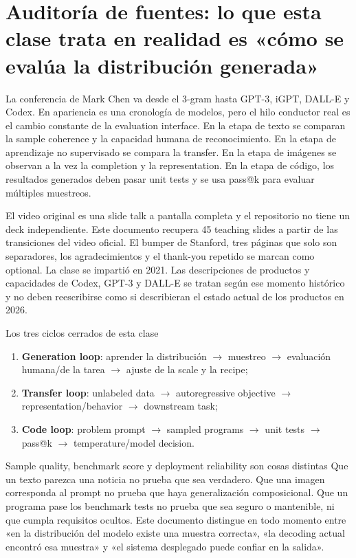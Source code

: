 \section{Auditoría de fuentes: lo que esta clase trata en realidad es «cómo se evalúa la distribución generada»}

La conferencia de Mark Chen va desde el 3-gram hasta GPT-3, iGPT, DALL-E y Codex. En apariencia es una cronología de modelos, pero el hilo conductor real es el cambio constante de la evaluation interface. En la etapa de texto se comparan la sample coherence y la capacidad humana de reconocimiento. En la etapa de aprendizaje no supervisado se compara la transfer. En la etapa de imágenes se observan a la vez la completion y la representation. En la etapa de código, los resultados generados deben pasar unit tests y se usa pass@k para evaluar múltiples muestreos.

El video original es una slide talk a pantalla completa y el repositorio no tiene un deck independiente. Este documento recupera 45 teaching slides a partir de las transiciones del video oficial. El bumper de Stanford, tres páginas que solo son separadores, los agradecimientos y el thank-you repetido se marcan como optional. La clase se impartió en 2021. Las descripciones de productos y capacidades de Codex, GPT-3 y DALL-E se tratan según ese momento histórico y no deben reescribirse como si describieran el estado actual de los productos en 2026.

\begin{importantbox}{Los tres ciclos cerrados de esta clase}
\begin{enumerate}
  \item \textbf{Generation loop}: aprender la distribución $\rightarrow$ muestreo $\rightarrow$ evaluación humana/de la tarea $\rightarrow$ ajuste de la scale y la recipe;
  \item \textbf{Transfer loop}: unlabeled data $\rightarrow$ autoregressive objective $\rightarrow$ representation/behavior $\rightarrow$ downstream task;
  \item \textbf{Code loop}: problem prompt $\rightarrow$ sampled programs $\rightarrow$ unit tests $\rightarrow$ pass@k $\rightarrow$ temperature/model decision.
\end{enumerate}
\end{importantbox}

\begin{warningbox}{Sample quality, benchmark score y deployment reliability son cosas distintas}
Que un texto parezca una noticia no prueba que sea verdadero. Que una imagen corresponda al prompt no prueba que haya generalización composicional. Que un programa pase los benchmark tests no prueba que sea seguro o mantenible, ni que cumpla requisitos ocultos. Este documento distingue en todo momento entre «en la distribución del modelo existe una muestra correcta», «la decoding actual encontró esa muestra» y «el sistema desplegado puede confiar en la salida».
\end{warningbox}


